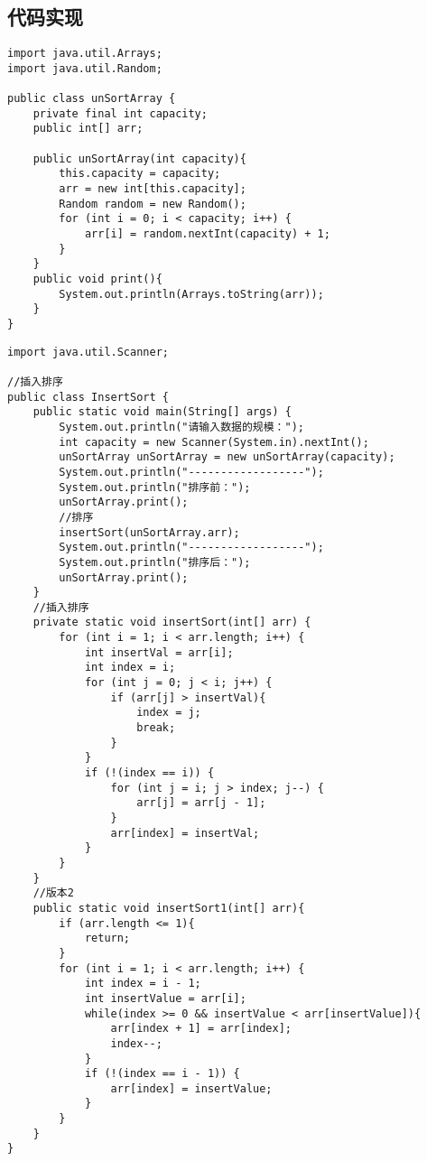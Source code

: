 \documentclass[a4paper]{report}
\begin{document}
\subsection{代码实现}
\begin{lstlisting}[title = 未排序数组类]
import java.util.Arrays;
import java.util.Random;

public class unSortArray {
    private final int capacity;
    public int[] arr;

    public unSortArray(int capacity){
        this.capacity = capacity;
        arr = new int[this.capacity];
        Random random = new Random();
        for (int i = 0; i < capacity; i++) {
            arr[i] = random.nextInt(capacity) + 1;
        }
    }
    public void print(){
        System.out.println(Arrays.toString(arr));
    }
}

\end{lstlisting}
\begin{lstlisting}[title = 插入排序]
import java.util.Scanner;

//插入排序
public class InsertSort {
    public static void main(String[] args) {
        System.out.println("请输入数据的规模：");
        int capacity = new Scanner(System.in).nextInt();
        unSortArray unSortArray = new unSortArray(capacity);
        System.out.println("------------------");
        System.out.println("排序前：");
        unSortArray.print();
        //排序
        insertSort(unSortArray.arr);
        System.out.println("------------------");
        System.out.println("排序后：");
        unSortArray.print();
    }
    //插入排序
    private static void insertSort(int[] arr) {
        for (int i = 1; i < arr.length; i++) {
            int insertVal = arr[i];
            int index = i;
            for (int j = 0; j < i; j++) {
                if (arr[j] > insertVal){
                    index = j;
                    break;
                }
            }
            if (!(index == i)) {
                for (int j = i; j > index; j--) {
                    arr[j] = arr[j - 1];
                }
                arr[index] = insertVal;
            }
        }
    }
    //版本2
    public static void insertSort1(int[] arr){
        if (arr.length <= 1){
            return;
        }
        for (int i = 1; i < arr.length; i++) {
            int index = i - 1;
            int insertValue = arr[i];
            while(index >= 0 && insertValue < arr[insertValue]){
                arr[index + 1] = arr[index];
                index--;
            }
            if (!(index == i - 1)) {
                arr[index] = insertValue;
            }
        }
    }
}
\end{lstlisting}
\end{document}
